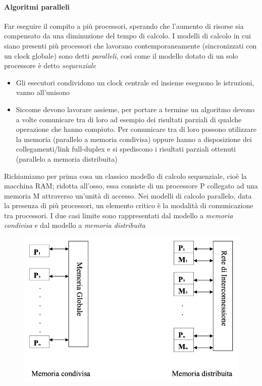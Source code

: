 \paragraph{Algoritmi paralleli}
Far eseguire il compito a più processori, sperando che l’aumento di risorse sia compensato da una diminuzione del tempo di calcolo. I modelli di calcolo in cui siano presenti più processori che lavorano contemporaneamente (sincronizzati con un clock globale) sono detti \textit{paralleli}, così come il modello dotato di un solo processore è detto \textit{sequenziale}
\begin{itemize}
    \item Gli esecutori condividono un clock centrale ed insieme eseguono le istruzioni, vanno all'unisono
    \item Siccome devono lavorare assieme, per portare a termine un algoritmo devono a volte comunicare tra di loro ad esempio dei risultati parziali di qualche operazione che hanno compiuto. Per comunicare tra di loro possono utilizzare la memoria (parallelo a memoria condivisa) oppure hanno a disposizione dei collegamenti/link full-duplex e si spediscono i risultati parziali ottenuti (parallelo a memoria distribuita)
\end{itemize}

Richiamiamo per prima cosa un classico modello di calcolo sequenziale, cioè la macchina RAM; ridotta all’osso, essa consiste di un processore P collegato ad una memoria M attraverso un'unità di accesso. Nei modelli di calcolo parallelo, data la presenza di più processori, un elemento critico è la modalità di comunicazione tra processori. I due casi limite sono rappresentati dal modello a \textit{memoria condivisa} e dal modello a \textit{memoria distribuita}

\begin{figure}[h]
    \centering
    \includegraphics[scale=0.4]{images/memoria_condivisa_distribuita.png}
\end{figure}

